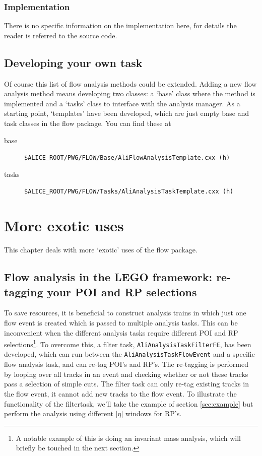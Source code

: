 \documentclass[a4paper]{book}
\numberwithin{equation}{subsection}
\begin{document}
\subsection{Implementation}
There is no specific information on the implementation here, for details the reader is referred to the source code.

\section{Developing your own task}
Of course this list of flow analysis methods could be extended. Adding a new flow analysis method means developing two classes: a `base' class where the method is implemented and a `tasks' class to interface with the analysis manager. As a starting point, `templates' have been developed, which are just empty base and task classes in the flow package. You can find these at
\begin{description}
\item[base] \texttt{\$ALICE\_ROOT/PWG/FLOW/Base/AliFlowAnalysisTemplate.cxx (h)}
\item[tasks] \texttt{\$ALICE\_ROOT/PWG/FLOW/Tasks/AliAnalysisTaskTemplate.cxx (h)}
\end{description}
	
		
\chapter{More exotic uses}\label{sec:exotic}
This chapter deals with more `exotic' uses of the flow package. 
\section{Flow analysis in the LEGO framework: re-tagging your POI and RP selections}
To save resources, it is beneficial to construct analysis trains in which just one flow event is created which is passed to multiple analysis tasks. This can be inconvenient when the different analysis tasks require different POI and RP selections\footnote{A notable example of this is doing an invariant mass analysis, which will briefly be touched in the next section.}. To overcome this, a filter task, \texttt{AliAnalysisTaskFilterFE}, has been developed, which can run between the \texttt{AliAnalysisTaskFlowEvent} and a specific flow analysis task, and can re-tag POI's and RP's. The re-tagging is performed by looping over all tracks in an event and checking whether or not these tracks pass a selection of simple cuts. The filter task can only re-tag existing tracks in the flow event, it cannot add new tracks to the flow event. To illustrate the functionality of the filtertask, we'll take the example of section \ref{sec:example} but perform the analysis using different $\vert \eta \vert$ windows for RP's.
\end{document}
